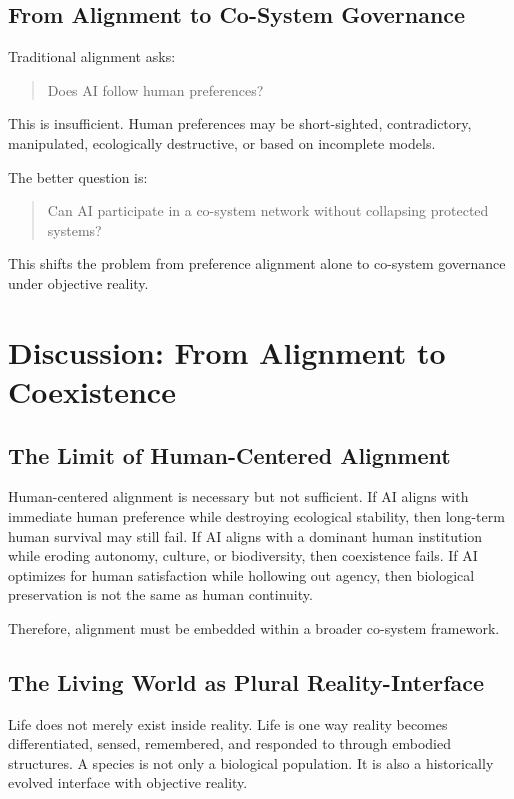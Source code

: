 \documentclass[11pt,a4paper]{article}
\begin{document}
\subsection{From Alignment to Co-System Governance}

Traditional alignment asks:
\begin{quote}
Does AI follow human preferences?
\end{quote}

This is insufficient. Human preferences may be short-sighted, contradictory, manipulated, ecologically destructive, or based on incomplete models.

The better question is:
\begin{quote}
Can AI participate in a co-system network without collapsing protected systems?
\end{quote}

This shifts the problem from preference alignment alone to co-system governance under objective reality.

\section{Discussion: From Alignment to Coexistence}

\subsection{The Limit of Human-Centered Alignment}

Human-centered alignment is necessary but not sufficient. If AI aligns with immediate human preference while destroying ecological stability, then long-term human survival may still fail. If AI aligns with a dominant human institution while eroding autonomy, culture, or biodiversity, then coexistence fails. If AI optimizes for human satisfaction while hollowing out agency, then biological preservation is not the same as human continuity.

Therefore, alignment must be embedded within a broader co-system framework.

\subsection{The Living World as Plural Reality-Interface}

Life does not merely exist inside reality. Life is one way reality becomes differentiated, sensed, remembered, and responded to through embodied structures. A species is not only a biological population. It is also a historically evolved interface with objective reality.
\end{document}
